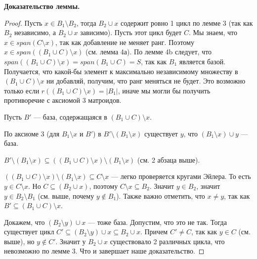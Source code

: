 \documentclass[a4paper, 12pt]{article}
\begin{document}
{\bf Доказательство леммы.}
\begin{proof}

Пусть $x \in B_1 \setminus B_2$, тогда $B_2 \cup x$ содержит ровно 1 цикл по
лемме 3 (так как $B_2$ независимо, а $B_2 \cup x$ зависимо). Пусть этот цикл
будет $C$. Мы знаем, что $x \in span(C \setminus x)$, так как добавление не 
меняет ранг. Поэтому $x \in span((B_1 \cup C) \setminus x)$ (см. лемма 4а). По 
лемме 4b следует, что
$span((B_1 \cup C) \setminus x) = span(B_1 \cup C) = S$, так как $B_1$ является 
базой. Получается, что какой-бы элемент к максимально независимому множеству 
в $(B_1 \cup C) \setminus x$ ни добавляй, получим, что ранг меняться не будет. 
Это возможно только если $r((B_1 \cup C) \setminus x) = |B_1|$, иначе мы могли
бы получить противоречие с аксиомой 3 матроидов.

Пусть $B'$ --- база, содержащаяся в $(B_1 \cup C) \setminus x$.

По аксиоме 3 (для $B_1 \setminus x$ и $B'$) в $B' \setminus (B_1 \setminus x)$ существует $y$, что 
$(B_1 \setminus x) \cup y$ --- база. 

$B' \setminus (B_1 \setminus x) \subseteq ((B_1 \cup C) \setminus x) \setminus
(B_1 \setminus x)$ (см. 2 абзаца выше).

$((B_1 \cup C) \setminus x) \setminus (B_1 \setminus x) \subseteq C \setminus x$
--- легко проверяется кругами Эйлера. То есть $y \in C \setminus x$. Но $C 
\subseteq (B_2 \cup x)$, поэтому $C \setminus x \subseteq B_2$. Значит $y \in B_2$,
значит $y \in B_2 \setminus B_1$ (см. выше, почему $y \not\in B_1$). Также важно отметить, что $x \neq y$, так как $B' \subseteq (B_1 \cup C)\setminus x$.

Докажем, что $(B_2 \setminus y) \cup x$ --- тоже база. Допустим, что это не так.
Тогда существует цикл
$C' \subseteq (B_2 \setminus y) \cup x \subseteq B_2 \cup x$. Причем $C' \neq C$,
так как $y \in C$ (см. выше), но $y \not\in C'$. Значит у $B_2 \cup x$ существовало 2 различных цикла,
что невозможно по лемме 3. Что и завершает наше доказательство.
\end{proof}
\end{document}
